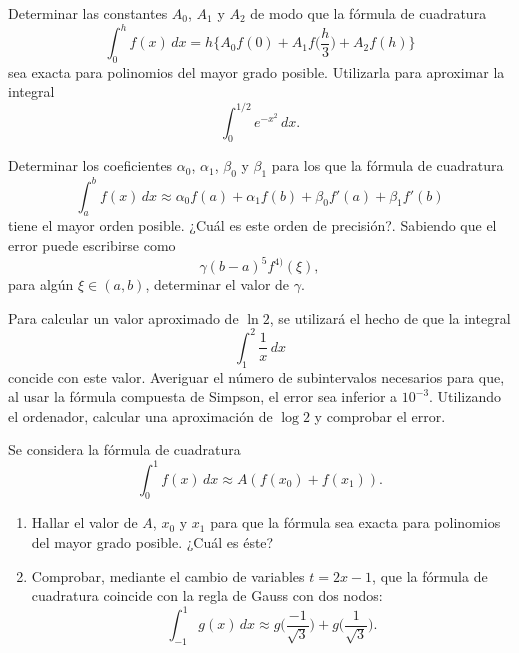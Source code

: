 \begin{EjerciciosPropuestos}
  \begin{problema}
  Determinar las constantes $A_0$, $A_1$ y $A_2$ de modo que la
  fórmula de cuadratura
  \begin{equation*}
    \int_0^h f(x)\,dx = h \bigg\{
    A_0f(0) + A_1f\bigg(\frac{h}{3}\bigg) + A_2 f(h) \bigg\}
  \end{equation*}
  sea exacta para polinomios del mayor grado posible. Utilizarla para
  aproximar la integral
  \begin{equation*}
    \int_0^{1/2} e^{-x^2}\, dx.
  \end{equation*}
  \end{problema}

  \begin{problema}
    Determinar los coeficientes $\alpha_0$, $\alpha_1$,  $\beta_0$ y
    $\beta_1$ para los que la fórmula de cuadratura
    \begin{equation*}
      \int_a^b f(x)\, dx \approx \alpha_0 f(a) + \alpha_1 f(b)
      + \beta_0 f'(a) + \beta_1 f'(b)
    \end{equation*}
    tiene el mayor orden posible. ¿Cuál es este orden de precisión?.
    Sabiendo que el error puede escribirse como
    \begin{equation*}
      \gamma (b-a)^5 f^{4)}(\xi),
    \end{equation*}
    para algún $\xi\in(a,b)$, determinar el valor de $\gamma$.
  \end{problema}

  \begin{problema}
    Para calcular un valor aproximado de $\ln 2$, se utilizará el
    hecho de que la integral
    \begin{equation*}
      \int_1^2 \frac{1}{x}\, dx
    \end{equation*}
    concide con este valor. Averiguar el número de subintervalos
    necesarios para que, al usar la fórmula compuesta de Simpson, el
    error sea inferior a $10^{-3}$. Utilizando el ordenador, calcular
    una aproximación de $\log 2$ y comprobar el error.
  \end{problema}

  \begin{problema}
    Se considera la fórmula de cuadratura
    \begin{equation*}
      \int_0^1 f(x)\, dx \approx A (f(x_0) + f(x_1)).
    \end{equation*}
    \begin{enumerate}
    \item Hallar el valor de $A$, $x_0$ y $x_1$ para que la
      fórmula sea exacta para polinomios del mayor grado
      posible. ¿Cuál es éste?
    \item Comprobar, mediante el cambio de variables $t=2x-1$, que
      la fórmula de cuadratura coincide con la regla de Gauss con
      dos nodos:
      \begin{equation*}
        \int_{-1}^1 g(x)\,dx \approx g\bigg(\frac{-1}{\sqrt
          3}\bigg) + g\bigg(\frac{1}{\sqrt 3}\bigg).
      \end{equation*}
    \end{enumerate}
  \end{problema}


\end{EjerciciosPropuestos}
